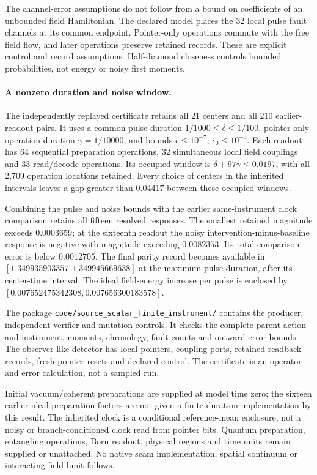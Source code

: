 The channel-error assumptions do not follow from a bound on coefficients of
an unbounded field Hamiltonian. The declared model places the 32 local pulse
fault channels at its common endpoint. Pointer-only operations commute with
the free field flow, and later operations preserve retained records.
These are explicit control and record assumptions. Half-diamond closeness
controls bounded probabilities, not energy or noisy first moments.

\paragraph{A nonzero duration and noise window.}
The independently replayed certificate retains all 21 centers and all 210
earlier-readout pairs. It uses a common pulse duration
$1/1000\le\delta\le1/100$, pointer-only operation duration
$\gamma=1/10000$, and bounds
$\epsilon\le10^{-7}$, $\epsilon_0\le10^{-5}$.
Each readout has 64 sequential preparation operations, 32 simultaneous
local field couplings and 33 read/decode operations. Its occupied window
is $\delta+97\gamma\le0.0197$, with all 2,709 operation locations retained.
Every choice of centers in the inherited intervals leaves a gap greater
than $0.04417$ between these occupied windows.

Combining the pulse and noise bounds with the earlier same-instrument
clock comparison retains all fifteen resolved responses. The smallest
retained magnitude exceeds $0.0003659$; at the sixteenth readout the noisy
intervention-minus-baseline response is negative with magnitude exceeding
$0.0082353$. Its total comparison error is below $0.0012705$.
The final parity record becomes available in
$[1.349935903357,1.349945669638]$ at the maximum pulse duration, after its
center-time interval. The ideal field-energy increase per pulse is enclosed
by $[0.007652475342308,0.007656300183578]$.

The package \texttt{code/source\_scalar\_finite\_instrument/} contains the
producer, independent verifier and mutation controls. It checks the complete
parent action and instrument, moments, chronology, fault counts and outward
error bounds. The observer-like detector has local pointers, coupling ports,
retained readback records, fresh-pointer resets and declared control. The
certificate is an operator and error calculation, not a sampled run.

Initial vacuum/coherent preparations are supplied at model time zero; the
sixteen earlier ideal preparation factors are not given a finite-duration
implementation by this result. The inherited clock is a conditional
reference-mean enclosure, not a noisy or branch-conditioned clock read from
pointer bits. Quantum preparation, entangling operations, Born readout,
physical regions and time units remain supplied or unattached. No native
seam implementation, spatial continuum or interacting-field limit follows.
